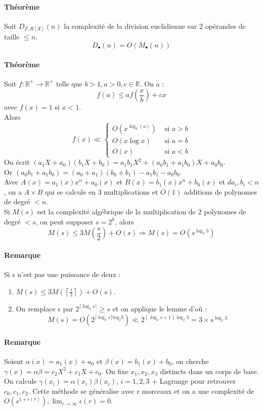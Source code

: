 \documentclass[12pt,a4paper]{report}
\begin{document}
\paragraph{Théorème\\}
Soit $D_{\mathbb{Z},R[X]}(n)$ la complexité de la division euclidienne sur 2 opérandes de taille $\leqslant n$. $$D_{\bullet}(n) = O(M_{\bullet}(n))$$
\paragraph{Théorème\\}
Soit $f : \mathbb{R}^+ \longrightarrow  \mathbb{R}^+$ telle que  $ b>1, a>0, c \in \mathbb{R}$. On a :
$$ f(a) \leqslant a f\left(\frac{x}{b}\right)+cx $$avec $f(x)=1$ si $x<1$.\\
Alors $$f(x) \ll \left\{ \begin{array}{ll}
O(x^{\log_b(a)}) & \mbox{ si } a>b \\
O(x\log x) & \mbox{ si } a=b\\
O(x) & \mbox{ si } a<b \end{array}\right. $$
On écrit $(a_1X+a_0)(b_1X+b_0) = a_1b_1 X^2 + (a_0b_1+a_1b_0) X + a_0b_0$.\\ Or $ (a_0b_1+a_1b_0) = (a_0+a_1)(b_0+b_1)-a_1b_1 - a_0b_0$.\\
Avec $ A(x) = a_1(x)x^n + a_0(x) $ et $ B(x) = b_1(x)x^n+b_0(x)$ et $d a_i,b_i < n $, on a $A\times B$ qui se calcule en 3 multiplications et $O(1) $ additions de polynomes de degré $<n$.\\
Si $M(s)$ est la complexité algébrique de la multiplication de 2 polynomes de degré $<s$, on peut supposer $s=2^k$, alors $$M(s) \leqslant 3M\left(\frac{s}{2}\right) + O(s) \Rightarrow M(s) = O(s^{\log_2 3})$$
\paragraph{Remarque\\}
Si s n'est pas une puissance de deux :
\begin{enumerate}
\item $\displaystyle M(s)\leqslant 3M\left(\left\lceil \frac{s}{2} \right\rceil \right) + O(s)$.
\item On remplace s par $2^{\lceil \log_2 s \rceil } \geqslant s $ et on applique le lemme d'où :
$$ M(s) = O(2^{\lceil \log_2 s \rceil log_2 3}) \ll 2^{(\log_2 s +1)\log_2 3} = 3\times s^{\log_2 3}$$
\end{enumerate}
\paragraph{Remarque\\}
Soient $ \alpha(x)= a_1(x) + a_0$ et $\beta(x)=b_1(x)+b_0$, on cherche $ \gamma (x) = \alpha \beta = c_2 X^2 + c_1 X + c_0$. On fixe $x_1,x_2,x_3$ distincts dans un corps de base.\\
On calcule $\gamma (x_i) = \alpha(x_i) \beta(x_i)$, $i=1,2,3$ + Lagrange pour retrouver $c_0,c_1,c_2$. Cette méthode se généralise avec r morceaux et on a une complexité de $ O(s^{1+\epsilon(r)}),\displaystyle \lim_{r \rightarrow \infty} \epsilon(r) = 0$.
\end{document}
